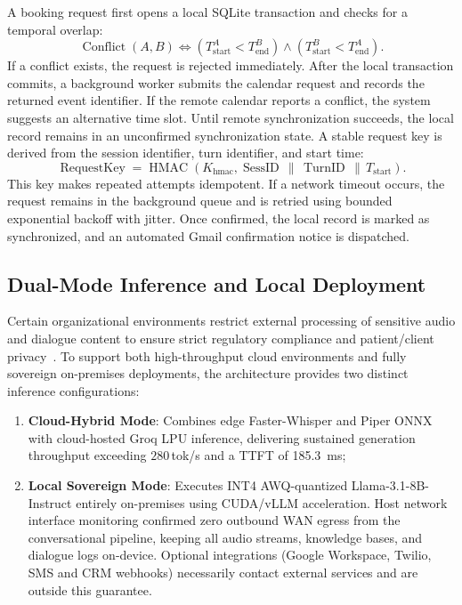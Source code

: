 \documentclass[review,12pt,times,authoryear]{elsarticle}
\theoremstyle{definition}
\begin{document}
A booking request first opens a local SQLite transaction and checks for a temporal overlap:
\begin{equation}
  \operatorname{Conflict}(A, B) \iff (T_{\mathrm{start}}^A < T_{\mathrm{end}}^B) \land (T_{\mathrm{start}}^B < T_{\mathrm{end}}^A).
\end{equation}
If a conflict exists, the request is rejected immediately. After the local transaction commits, a background worker submits the calendar request and records the returned event identifier. If the remote calendar reports a conflict, the system suggests an alternative time slot. Until remote synchronization succeeds, the local record remains in an unconfirmed synchronization state. A stable request key is derived from the session identifier, turn identifier, and start time:
\begin{equation}
  \operatorname{RequestKey} = \operatorname{HMAC}(K_{\mathrm{hmac}}, \operatorname{SessID} \,\|\, \operatorname{TurnID} \,\|\, T_{\mathrm{start}}).
\end{equation}
This key makes repeated attempts idempotent. If a network timeout occurs, the request remains in the background queue and is retried using bounded exponential backoff with jitter. Once confirmed, the local record is marked as synchronized, and an automated Gmail confirmation notice is dispatched.

\subsection{Dual-Mode Inference and Local Deployment}
Certain organizational environments restrict external processing of sensitive audio and dialogue content to ensure strict regulatory compliance and patient/client privacy~\citep{Wang2025edge}. To support both high-throughput cloud environments and fully sovereign on-premises deployments, the architecture provides two distinct inference configurations:
\begin{enumerate}[noitemsep]
  \item \textbf{Cloud-Hybrid Mode}: Combines edge Faster-Whisper and Piper ONNX with cloud-hosted Groq LPU inference, delivering sustained generation throughput exceeding $280$\,tok/s and a TTFT of \SI{185.3}{\milli\second};
  \item \textbf{Local Sovereign Mode}: Executes INT4 AWQ-quantized Llama-3.1-8B-Instruct entirely on-premises using CUDA/vLLM acceleration. Host network interface monitoring confirmed zero outbound WAN egress from the conversational pipeline, keeping all audio streams, knowledge bases, and dialogue logs on-device. Optional integrations (Google Workspace, Twilio, SMS and CRM webhooks) necessarily contact external services and are outside this guarantee.
\end{enumerate}
\end{document}
